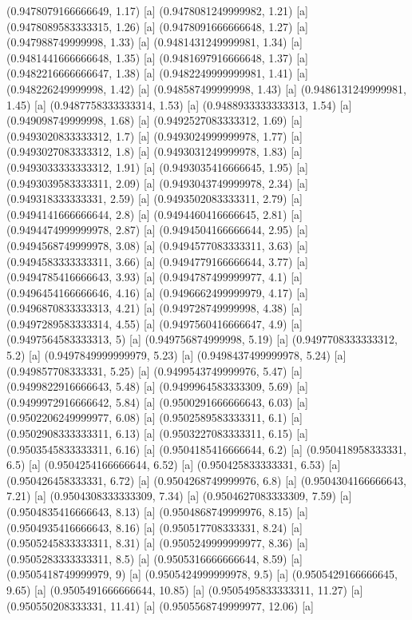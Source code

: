 {{{(0.9478079166666649, 1.17) [a] 
(0.9478081249999982, 1.21) [a] 
(0.9478089583333315, 1.26) [a] 
(0.9478091666666648, 1.27) [a] 
(0.947988749999998, 1.33) [a] 
(0.9481431249999981, 1.34) [a] 
(0.9481441666666648, 1.35) [a] 
(0.9481697916666648, 1.37) [a] 
(0.9482216666666647, 1.38) [a] 
(0.9482249999999981, 1.41) [a] 
(0.948226249999998, 1.42) [a] 
(0.948587499999998, 1.43) [a] 
(0.9486131249999981, 1.45) [a] 
(0.9487758333333314, 1.53) [a] 
(0.9488933333333313, 1.54) [a] 
(0.949098749999998, 1.68) [a] 
(0.9492527083333312, 1.69) [a] 
(0.9493020833333312, 1.7) [a] 
(0.9493024999999978, 1.77) [a] 
(0.9493027083333312, 1.8) [a] 
(0.9493031249999978, 1.83) [a] 
(0.9493033333333312, 1.91) [a] 
(0.9493035416666645, 1.95) [a] 
(0.9493039583333311, 2.09) [a] 
(0.9493043749999978, 2.34) [a] 
(0.949318333333331, 2.59) [a] 
(0.9493502083333311, 2.79) [a] 
(0.9494141666666644, 2.8) [a] 
(0.9494460416666645, 2.81) [a] 
(0.9494474999999978, 2.87) [a] 
(0.9494504166666644, 2.95) [a] 
(0.9494568749999978, 3.08) [a] 
(0.9494577083333311, 3.63) [a] 
(0.9494583333333311, 3.66) [a] 
(0.9494779166666644, 3.77) [a] 
(0.9494785416666643, 3.93) [a] 
(0.9494787499999977, 4.1) [a] 
(0.9496454166666646, 4.16) [a] 
(0.9496662499999979, 4.17) [a] 
(0.9496870833333313, 4.21) [a] 
(0.949728749999998, 4.38) [a] 
(0.9497289583333314, 4.55) [a] 
(0.9497560416666647, 4.9) [a] 
(0.9497564583333313, 5) [a] 
(0.949756874999998, 5.19) [a] 
(0.9497708333333312, 5.2) [a] 
(0.9497849999999979, 5.23) [a] 
(0.9498437499999978, 5.24) [a] 
(0.949857708333331, 5.25) [a] 
(0.9499543749999976, 5.47) [a] 
(0.9499822916666643, 5.48) [a] 
(0.9499964583333309, 5.69) [a] 
(0.9499972916666642, 5.84) [a] 
(0.9500291666666643, 6.03) [a] 
(0.9502206249999977, 6.08) [a] 
(0.9502589583333311, 6.1) [a] 
(0.9502908333333311, 6.13) [a] 
(0.9503227083333311, 6.15) [a] 
(0.9503545833333311, 6.16) [a] 
(0.9504185416666644, 6.2) [a] 
(0.950418958333331, 6.5) [a] 
(0.9504254166666644, 6.52) [a] 
(0.950425833333331, 6.53) [a] 
(0.950426458333331, 6.72) [a] 
(0.9504268749999976, 6.8) [a] 
(0.9504304166666643, 7.21) [a] 
(0.9504308333333309, 7.34) [a] 
(0.9504627083333309, 7.59) [a] 
(0.9504835416666643, 8.13) [a] 
(0.9504868749999976, 8.15) [a] 
(0.9504935416666643, 8.16) [a] 
(0.950517708333331, 8.24) [a] 
(0.9505245833333311, 8.31) [a] 
(0.9505249999999977, 8.36) [a] 
(0.9505283333333311, 8.5) [a] 
(0.9505316666666644, 8.59) [a] 
(0.9505418749999979, 9) [a] 
(0.9505424999999978, 9.5) [a] 
(0.9505429166666645, 9.65) [a] 
(0.9505491666666644, 10.85) [a] 
(0.9505495833333311, 11.27) [a] 
(0.950550208333331, 11.41) [a] 
(0.9505568749999977, 12.06) [a] 
}}}
